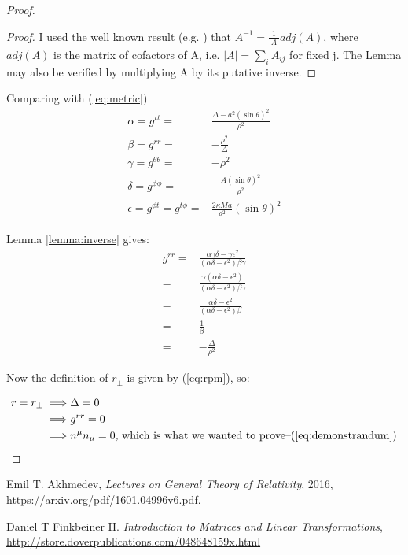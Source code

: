 \documentclass[]{article}
\begin{document}
\begin{proof}
\begin{proof}
	I used the well known result (e.g. \cite[Theorem 5.2]{finkbeiner1960}) that $A^{-1} = \frac{1}{|A|} adj(A)$, where $adj(A)$ is the matrix of cofactors of A, i.e. $|A|=\sum_{i} A_{ij}$ for fixed j. The Lemma may also be verified by multiplying A by its putative inverse.
\end{proof}	

Comparing with (\ref{eq:metric})
\begin{align*}
\alpha =g^{tt}=& \frac{\Delta-a^2 (\sin{\theta})^2}{\rho^2}\\
\beta=g^{rr}=& - \frac{\rho^2}{\Delta} \\
\gamma =g^{\theta\theta}=& -\rho^2\\
\delta=g^{\phi\phi}=& - \frac{A (\sin{\theta})^2}{\rho^2} \\ 
\epsilon =g^{\phi t}=g^{t\phi}=&\frac{2 \kappa M a}{\rho^2}(\sin{\theta})^2 
\end{align*}

Lemma \ref{lemma:inverse} gives:
\begin{align*}
g^{rr}=& \frac{ \alpha\gamma\delta - \gamma \epsilon^2}{(\alpha\delta-\epsilon^2)\beta\gamma}\\
=& \frac{ \gamma(\alpha\delta -  \epsilon^2)}{(\alpha\delta-\epsilon^2)\beta\gamma}\\
=& \frac{ \alpha\delta -  \epsilon^2}{(\alpha\delta-\epsilon^2)\beta}\\
=& \frac{1}{\beta}\\
=& -\frac{\Delta}{\rho^2}
\end{align*}

Now the definition of $r_{\pm}$ is given by (\ref{eq:rpm}), so:

\begin{align*}
r=r_{\pm} \implies& \Delta = 0 \\
\implies& g^{rr} = 0 \\
\implies& n^{\mu}n_{\mu}=0 \text{, which is what we wanted to prove--(\ref{eq:demonstrandum})}
\end{align*}
\end{proof}


\begin{thebibliography}{9}
	
	Emil T. Akhmedev,
	\emph{Lectures on General Theory of Relativity},
	2016,
	\url{https://arxiv.org/pdf/1601.04996v6.pdf}.
	
	Daniel T Finkbeiner II.
	\emph{Introduction to Matrices and Linear Transformations},
	\url{http://store.doverpublications.com/048648159x.html}
	
\end{thebibliography}
\end{document}
